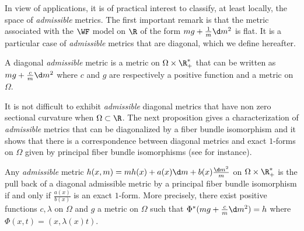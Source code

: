 In view of applications, it is of practical interest to classify, at least locally, the space of \textit{admissible} metrics. The first important remark is that the metric associated with the $\WF$ model on $\R$ of the form $mg +  \frac{1}{ m} \d m^2$ is flat. It is a particular case of \textit{admissible} metrics that are diagonal, which we define hereafter.
\begin{definition}
A diagonal \textit{admissible}  metric is a metric on $\Omega \times \R_+^*$ that can be written as $mg +  \frac{c}{m} \d m^2$ where $c$ and $g$ are respectively a positive function and a metric on $\Omega$. 
\end{definition}
It is not difficult to exhibit \textit{admissible} diagonal metrics that have non zero sectional curvature when $\Omega \subset \R$.
The next proposition gives a characterization of  \textit{admissible}  metrics that can be diagonalized by a fiber bundle isomorphism \cite[Section 17]{Michor2008b} and it shows that there is a correspondence between diagonal metrics and exact $1$-forms on $\Omega$ given by principal fiber bundle isomorphisms (see \cite[Section 18.6]{Michor2008b} for instance).

\begin{proposition}
Any \textit{admissible} metric $h(x,m) = m h(x) + a(x)  \d m + b(x) \frac{\d m^2}{m}$ on $\Omega \times \R_+^*$ is the pull back of a diagonal admissible metric by a principal fiber bundle isomorphism if and only if $\frac{a(x)}{b(x)}$ is an exact  $1$-form. More precisely, there exist positive functions $c, \lambda$ on $\Omega$ and $g$ a metric on $\Omega$ such that $\Phi^*(mg +  \frac{c}{ m} \d m^2) = h$ where $\Phi(x,t)= (x,\lambda(x)t)$.
\end{proposition}


